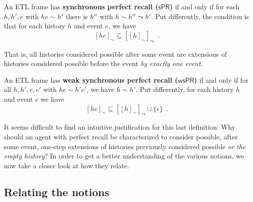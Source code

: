 \documentclass{article}
\newcommand{\PRs}{\ensuremath{\mathsf{sPR}}\xspace}
\newcommand{\PRsprime}{\ensuremath{\mathsf{wsPR}}\xspace}
\def\dfn{\textbf}
\newcommand{\acc}{\sim}
\newcommand{\tiff}{if and only if\xspace}
\newcommand{\mpunct}{\enspace}
\newcounter{#1}
\begin{document}
\begin{definition} An ETL frame has \dfn{synchronous perfect recall (\PRs)} \tiff
  for each $h,h',e$ with $he\acc h'$ there is $h''$ with $h\acc h''\leadsto h'$.
  Put differently,
  the condition is that for each history $h$ and event $e$, we have
  \[
  [he]_\acc\subseteq [[h]_\acc]_\leadsto\mpunct.
  \]
\end{definition}
That is, all histories considered possible after some event
are extensions of histories considered possible before the event \emph{by exactly one event}.

\begin{definition}
  An ETL frame has \dfn{weak synchronous perfect recall (\PRsprime)} \tiff
  for all $h,h',e,e'$ with $he\acc h'e'$, we have $h\acc h'$.
  Put differently, 
  for each history $h$ and event $e$ we have
  \[
  [he]_\acc\subseteq [[h]_\acc]_\leadsto\cup\{\epsilon\}\mpunct.
  \]
\end{definition}

It seems difficult to find an intuitive justification for this last definition:
Why should an agent with perfect recall be characterized to consider possible,
after some event, one-step extensions of histories previously considered possible
\emph{or the empty history}?
In order to get a better understanding of the various notions,
we now take a closer look at how they relate.

\subsection{Relating the notions}
\label{sec:relating-notions}
\end{document}
